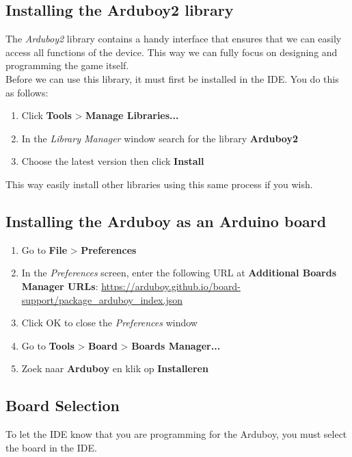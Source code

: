 \documentclass[11pt,fleqn]{book} %
\begin{document}
\subsection{Installing the Arduboy2 library}
The \emph{Arduboy2} library contains a handy interface that ensures that we can easily access all functions of the device. This way we can fully focus on designing and programming the game itself.\\

\noindent
Before we can use this library, it must first be installed in the IDE. You do this as follows:\\

\begin{enumerate}
	\item Click \textbf{Tools} > \textbf{Manage Libraries...}
	\item In the \emph{Library Manager} window search for the library \textbf{Arduboy2}
	\item Choose the latest version then click \textbf{Install}
\end{enumerate}

This way easily install other libraries using this same process if you wish.

\subsection{Installing the Arduboy as an Arduino board}
\begin{enumerate}
	\item Go to \textbf{File} > \textbf{Preferences}
	\item In the \emph{Preferences} screen, enter the following URL at \textbf{Additional Boards Manager URLs}: \url{https://arduboy.github.io/board-support/package_arduboy_index.json}
	\item Click OK to close the \emph{Preferences} window
	\item Go to \textbf{Tools} > \textbf{Board} > \textbf{Boards Manager...}
	\item Zoek naar \textbf{Arduboy} en klik op \textbf{Installeren}
\end{enumerate}

\subsection{Board Selection}
To let the IDE know that you are programming for the Arduboy, you must select the board in the IDE.
\end{document}

